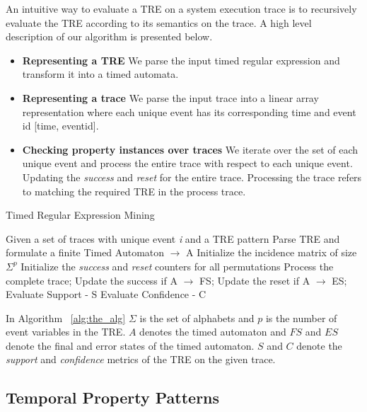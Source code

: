 \documentclass[]{sigplanconf}
\begin{document}
An intuitive way to evaluate a TRE on a system execution trace is to recursively evaluate the TRE according to its semantics on the trace. A high level description of our algorithm is presented below.

\begin{itemize}
\item \textbf{Representing a TRE} We parse the input timed regular expression and transform it into a timed automata.
\item \textbf{Representing a trace} We parse the input trace into a  linear array representation where each unique event has its corresponding time and event id [time, eventid].
\item \textbf{Checking property instances over traces} We iterate over the set of each unique event and process the entire trace with respect to each unique event. Updating the \emph{success} and \emph{reset} for the entire trace. Processing the trace refers to matching the required TRE in the process trace.
\end{itemize}


\begin{algorithm}[h]
    \caption{Timed Regular Expression Mining}\label{alg:the_alg}
    \begin{algorithmic}[1]
     \Require  Given a set of traces with unique event \emph{i} and a TRE pattern
     \Ensure Parse TRE and formulate a finite Timed Automaton $\rightarrow$ A
     \State Initialize the incidence matrix of size $\Sigma^p$
     \State Initialize the \emph{success} and \emph{reset} counters for all permutations
        \State Process the complete trace;
        \State Update the success if A $\rightarrow$ FS;
        \State Update the reset if A $\rightarrow$ ES;
     \EndFor
     \State Evaluate Support - S
     \State Evaluate Confidence - C
    \end{algorithmic}
\end{algorithm}

In Algorithm ~\ref{alg:the_alg} $\Sigma$ is the set of alphabets and $p$ is the number of event variables in the TRE. $A$ denotes the timed automaton and $FS$ and $ES$ denote the final and error states of the timed automaton. $S$ and $C$ denote the \emph{support} and \emph{confidence} metrics of the TRE on the given trace.

\subsection{Temporal Property Patterns}
\end{document}
